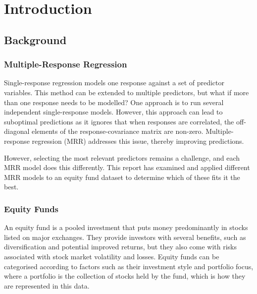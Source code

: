 \documentclass[11pt]{report} %
\renewcommand{\abstractname}{Acknowledgement} %
\begin{document}
\renewcommand{\abstractname}{Declaration} %

\begin{abstract}
This piece of work is a result of my own work and I have complied with the Department’s guidance on multiple submission and on the use of AI tools. Material from the work of others not involved in the project has been acknowledged, quotations and paraphrases suitably indicated, and all uses of AI tools have been declared.
\end{abstract}


\tableofcontents

\chapter{Introduction}
\section{Background}
\subsection{Multiple-Response Regression}
Single-response regression models one response against a set of predictor variables. This method can be extended to multiple predictors, but what if more than one response needs to be modelled? One approach is to run several independent single-response models. However, this approach can lead to suboptimal predictions as it ignores that when responses are correlated, the off-diagonal elements of the response-covariance matrix are non-zero. Multiple-response regression (MRR) addresses this issue, thereby improving predictions. 

However, selecting the most relevant predictors remains a challenge, and each MRR model does this differently. This report has examined and applied different MRR models to an equity fund dataset to determine which of these fits it the best.

\subsection{Equity Funds}
An equity fund is a pooled investment that puts money predominantly in stocks listed on major exchanges.\cite{Chen2024EquityFunds}
They provide investors with several benefits, such as diversification and potential improved returns, but they also come with risks associated with stock market volatility and losses.\cite{Chen2024EquityFunds}
Equity funds can be categorised according to factors such as their investment style and portfolio focus, where a portfolio is the collection of stocks held by the fund, which is how they are represented in this data.\cite{Chen2024EquityFunds}
\end{document}
